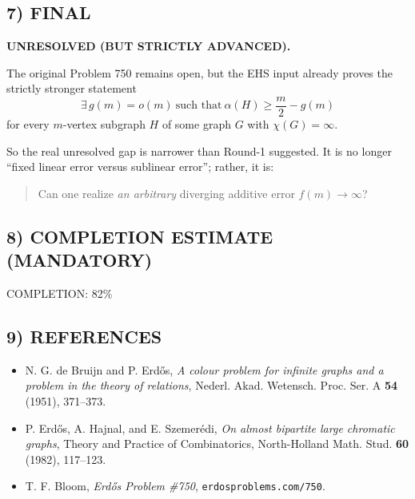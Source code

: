\subsection*{7) FINAL}

\noindent
\textbf{UNRESOLVED (BUT STRICTLY ADVANCED).}

The original Problem 750 remains open, but the EHS input already proves the strictly stronger statement
\[
\exists\,g(m)=o(m)\ \text{such that}\ \alpha(H)\ge \frac m2-g(m)
\]
for every $m$-vertex subgraph $H$ of some graph $G$ with $\chi(G)=\infty$.

So the real unresolved gap is narrower than Round-1 suggested. It is no longer ``fixed linear error versus sublinear error''; rather, it is:
\begin{quote}
Can one realize \emph{an arbitrary} diverging additive error $f(m)\to\infty$?
\end{quote}

\subsection*{8) COMPLETION ESTIMATE (MANDATORY)}

COMPLETION: 82\%

\subsection*{9) REFERENCES}

\begin{itemize}
\item N. G. de Bruijn and P. Erd\H{o}s, \emph{A colour problem for infinite graphs and a problem in the theory of relations}, Nederl. Akad. Wetensch. Proc. Ser. A \textbf{54} (1951), 371--373.
\item P. Erd\H{o}s, A. Hajnal, and E. Szemer\'edi, \emph{On almost bipartite large chromatic graphs}, Theory and Practice of Combinatorics, North-Holland Math. Stud. \textbf{60} (1982), 117--123.
\item T. F. Bloom, \emph{Erd\H{o}s Problem \#750}, \texttt{erdosproblems.com/750}.
\end{itemize}
